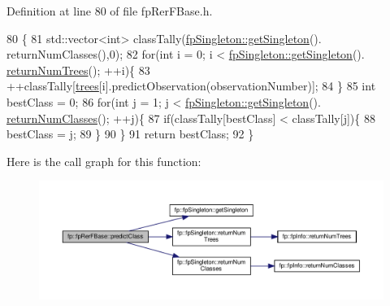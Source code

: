 Definition at line 80 of file fp\+Rer\+F\+Base.\+h.


\begin{DoxyCode}
80                                                           \{
81                 std::vector<int> classTally(\hyperlink{classfp_1_1fpSingleton_a8bdae77b68521003e3fc630edec2e240}{fpSingleton::getSingleton}().
      returnNumClasses(),0);
82                 \textcolor{keywordflow}{for}(\textcolor{keywordtype}{int} i = 0; i < \hyperlink{classfp_1_1fpSingleton_a8bdae77b68521003e3fc630edec2e240}{fpSingleton::getSingleton}().
      \hyperlink{classfp_1_1fpSingleton_a8be36616345b6b77ce4c60b99cc2b91c}{returnNumTrees}(); ++i)\{
83                     ++classTally[\hyperlink{classfp_1_1fpRerFBase_a6c2f12312e64e5234fc53741f1bfbe96}{trees}[i].predictObservation(observationNumber)];
84                 \}
85                 \textcolor{keywordtype}{int} bestClass = 0;
86                 \textcolor{keywordflow}{for}(\textcolor{keywordtype}{int} j = 1; j < \hyperlink{classfp_1_1fpSingleton_a8bdae77b68521003e3fc630edec2e240}{fpSingleton::getSingleton}().
      \hyperlink{classfp_1_1fpSingleton_a5602580110329a6b25602b1789e4e2c2}{returnNumClasses}(); ++j)\{
87                     \textcolor{keywordflow}{if}(classTally[bestClass] < classTally[j])\{
88                         bestClass = j;
89                     \}
90                 \}
91                 \textcolor{keywordflow}{return} bestClass;
92             \}
\end{DoxyCode}
Here is the call graph for this function\+:
\nopagebreak
\begin{figure}[H]
\begin{center}
\leavevmode
\includegraphics[width=350pt]{classfp_1_1fpRerFBase_a73ece66e774ad5f1a450f1422626947f_cgraph}
\end{center}
\end{figure}
\mbox{\label{classfp_1_1fpRerFBase_ade8132388aa51aca41c80986003070e4}} 
